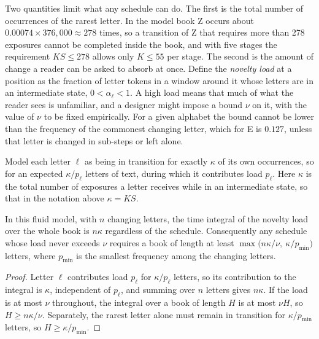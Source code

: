 Two quantities limit what any schedule can do. The first is the total number of occurrences of the rarest letter. In the model book Z occurs about $0.00074\times376{,}000\approx278$ times, so a transition of Z that requires more than 278 exposures cannot be completed inside the book, and with five stages the requirement $KS\le278$ allows only $K\le55$ per stage. The second is the amount of change a reader can be asked to absorb at once. Define the \emph{novelty load} at a position as the fraction of letter tokens in a window around it whose letters are in an intermediate state, $0<\alpha_\ell<1$. A high load means that much of what the reader sees is unfamiliar, and a designer might impose a bound $\nu$ on it, with the value of $\nu$ to be fixed empirically. For a given alphabet the bound cannot be lower than the frequency of the commonest changing letter, which for E is $0.127$, unless that letter is changed in sub-steps or left alone.

Model each letter $\ell$ as being in transition for exactly $\kappa$ of its own occurrences, so for an expected $\kappa/p_\ell$ letters of text, during which it contributes load $p_\ell$. Here $\kappa$ is the total number of exposures a letter receives while in an intermediate state, so that in the notation above $\kappa=KS$.

\begin{proposition}\label{prop:conservation}
In this fluid model, with $n$ changing letters, the time integral of the novelty load over the whole book is $n\kappa$ regardless of the schedule. Consequently any schedule whose load never exceeds $\nu$ requires a book of length at least $\max\bigl(n\kappa/\nu,\ \kappa/p_{\min}\bigr)$ letters, where $p_{\min}$ is the smallest frequency among the changing letters.
\end{proposition}

\begin{proof}
Letter $\ell$ contributes load $p_\ell$ for $\kappa/p_\ell$ letters, so its contribution to the integral is $\kappa$, independent of $p_\ell$, and summing over $n$ letters gives $n\kappa$. If the load is at most $\nu$ throughout, the integral over a book of length $H$ is at most $\nu H$, so $H\ge n\kappa/\nu$. Separately, the rarest letter alone must remain in transition for $\kappa/p_{\min}$ letters, so $H\ge\kappa/p_{\min}$.
\end{proof}

